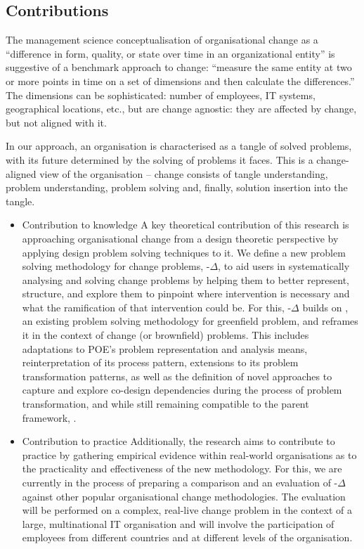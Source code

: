 \documentclass[runningheads,a4paper]{llncs}
\begin{document}
\subsection{Contributions}
The management science conceptualisation of organisational change  as a ``difference in form, quality, or state over time in an organizational entity'' \cite{Van-de-Ven:2017aa} is suggestive of a benchmark approach to change: ``measure the same entity at two or more points in time on a set of dimensions and then calculate the differences.'' The dimensions can be sophisticated: number of employees, IT systems, geographical locations, etc., but are change agnostic: they are affected by change, but not aligned with it.

In our approach, an organisation is characterised as a tangle of solved problems, with its future determined by the solving of problems it faces. This is a change-aligned view of the organisation – change consists of tangle understanding, problem understanding, problem solving and, finally, solution insertion into the tangle.
 
\begin{itemize}
	\item Contribution to knowledge
	A key theoretical contribution of this research is approaching organisational change from a design theoretic perspective by applying design problem solving techniques to it. We define a new problem solving methodology for change problems, \POE{}-$\Delta$, to aid users in systematically analysing and solving change problems by helping them to better represent, structure, and explore them to pinpoint where intervention is necessary and what the ramification of that intervention could be. For this, \POE{}-$\Delta$ builds on \POE{}, an existing problem solving methodology for greenfield problem, and reframes it in the context of change (or brownfield) problems. This includes adaptations to POE's problem representation and analysis means, reinterpretation of its process pattern, extensions to its problem transformation patterns, as well as the definition of novel approaches to capture and explore co-design dependencies during the process of problem transformation, and while still remaining compatible to the parent framework, \POE{}. 
	\item Contribution to practice
	Additionally, the research aims to contribute to practice by gathering empirical evidence within real-world organisations as to the practicality and effectiveness of the new methodology. For this, we are currently in the process of preparing a comparison and an evaluation of \POE{}-$\Delta$ against other popular organisational change methodologies. The evaluation will be performed on a complex, real-live change problem in the context of a large, multinational IT organisation and will involve the participation of employees from different countries and at different levels of the organisation.
\end{itemize}
\end{document}
